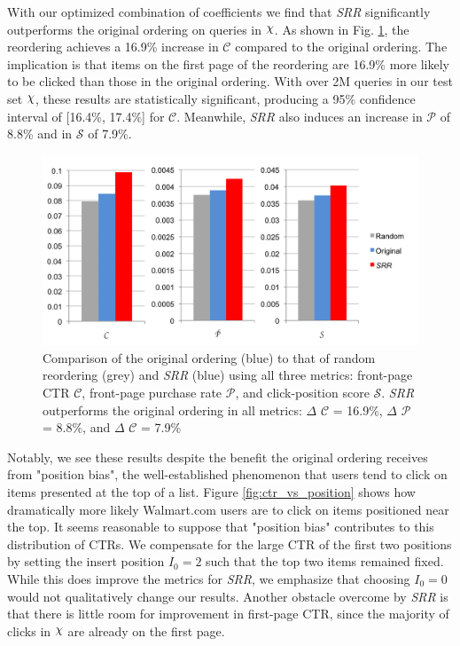 \documentclass{article}
\def\Chi{\raisebox{2pt}{$\chi$}}
\begin{document}
With our optimized combination of coefficients we find that {\em SRR}
significantly outperforms the original ordering on queries in $\Chi$. As shown
in Fig.  \ref{fig:compare_metric_performance}, the reordering achieves a 16.9\%
increase in $\mathscr{C}$ compared to the original ordering. The implication is
that items on the first page of the reordering are 16.9\% more likely to be
clicked than those in the original ordering. With over 2M queries in our test set
$\Chi$, these results are statistically significant, producing a 95\%
confidence interval of [16.4\%, 17.4\%] for $\mathscr{C}$. Meanwhile, {\em SRR}
also induces an increase in $\mathscr{P}$ of 8.8\% and in $\mathscr{S}$ of 7.9\%.

\begin{figure}[htbp!]
    \centering
    \includegraphics[width=\textwidth]{moneyshot.png}
    \caption{Comparison of the original ordering (blue) to that of random reordering (grey) and {\em SRR} (blue) using all three metrics: front-page CTR $\mathscr{C}$, front-page purchase rate $\mathscr{P}$, and click-position score $\mathscr{S}$. {\em SRR} outperforms the original ordering in all metrics: $\Delta$ $\mathscr{C}$ = 16.9\%, $\Delta$ $\mathscr{P}$ = 8.8\%, and $\Delta$ $\mathscr{C}$ = 7.9\%}
    \label{fig:compare_metric_performance}
\end{figure}

Notably, we see these results despite the benefit the original ordering
receives from "position bias", the well-established phenomenon that users tend
to click on items presented at the top of a list. Figure
\ref{fig:ctr_vs_position} shows how dramatically more likely Walmart.com users
are to click on items positioned near the top. It seems reasonable to suppose
that "position bias" contributes to this distribution of CTRs. We compensate
for the large CTR of the first two positions by setting the insert position
$I_0 = 2$ such that the top two items remained fixed. While this does improve
the metrics for {\em SRR}, we emphasize that choosing $I_0 = 0$ would not
qualitatively change our results. Another obstacle overcome by {\em SRR} is
that there is little room for improvement in first-page CTR, since the majority
of clicks in $\Chi$ are already on the first page.
\end{document}
